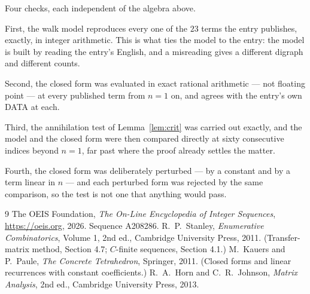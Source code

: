 \documentclass[11pt,a4paper]{article}
\theoremstyle{plain}
\theoremstyle{definition}
\begin{document}
Four checks, each independent of the algebra above.

First, the walk model reproduces every one of the $23$ terms the entry publishes,
exactly, in integer arithmetic. This is what ties the model to the entry: the model is built
by reading the entry's English, and a misreading gives a different digraph and different
counts.

Second, the closed form was evaluated in exact rational arithmetic --- not floating point ---
at every published term from $n=1$ on, and agrees with the entry's own DATA at each.

Third, the annihilation test of Lemma~\ref{lem:crit} was carried out exactly, and the model
and the closed form were then compared directly at sixty consecutive indices beyond
$n=1$, far past where the proof already settles the matter.

Fourth, the closed form was deliberately perturbed --- by a constant and by a term linear in
$n$ --- and each perturbed form was rejected by the same comparison, so the test is not one
that anything would pass.

\begin{thebibliography}{9}
 The OEIS Foundation, \emph{The On-Line Encyclopedia of Integer
Sequences}, \url{https://oeis.org}, 2026. Sequence A208286.
 R.~P.~Stanley, \emph{Enumerative Combinatorics}, Volume 1, 2nd ed.,
Cambridge University Press, 2011. (Transfer-matrix method, Section 4.7; $C$-finite sequences,
Section 4.1.)
 M.~Kauers and P.~Paule, \emph{The Concrete Tetrahedron}, Springer, 2011.
(Closed forms and linear recurrences with constant coefficients.)
 R.~A.~Horn and C.~R.~Johnson, \emph{Matrix Analysis}, 2nd ed., Cambridge
University Press, 2013.
\end{thebibliography}
\end{document}
